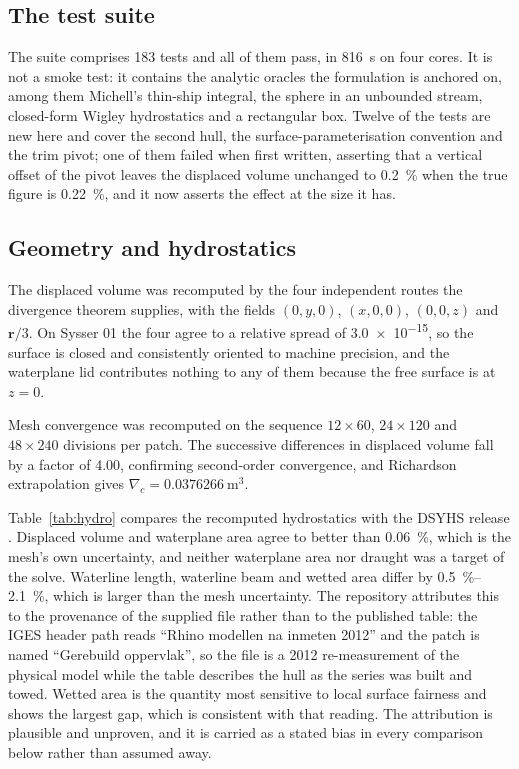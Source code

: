 \documentclass[11pt]{article}
\begin{document}
\subsection{The test suite}

The suite comprises 183 tests and all of them pass, in \SI{816}{\second} on four cores.
It is not a smoke test: it contains the analytic oracles the formulation is anchored on,
among them Michell's thin-ship integral, the sphere in an unbounded stream, closed-form
Wigley hydrostatics and a rectangular box. Twelve of the tests are new here and cover the
second hull, the surface-parameterisation convention and the trim pivot; one of them failed
when first written, asserting that a vertical offset of the pivot leaves the displaced volume
unchanged to \SI{0.2}{\percent} when the true figure is \SI{0.22}{\percent}, and it now
asserts the effect at the size it has.

\subsection{Geometry and hydrostatics}

The displaced volume was recomputed by the four independent routes the divergence theorem
supplies, with the fields $(0,y,0)$, $(x,0,0)$, $(0,0,z)$ and $\bm{r}/3$. On Sysser 01 the
four agree to a relative spread of \num{3.0e-15}, so the surface is closed and consistently
oriented to machine precision, and the waterplane lid contributes nothing to any of them
because the free surface is at $z=0$.

Mesh convergence was recomputed on the sequence $12\times60$, $24\times120$ and
$48\times240$ divisions per patch. The successive differences in displaced volume fall by a
factor of 4.00, confirming second-order convergence, and Richardson extrapolation gives
$\nabla_c = \SI{0.0376266}{\metre\cubed}$.

Table~\ref{tab:hydro} compares the recomputed hydrostatics with the DSYHS release
\citep{dsyhs_hydro}. Displaced volume and waterplane area agree to better than
\SI{0.06}{\percent}, which is the mesh's own uncertainty, and neither waterplane area nor
draught was a target of the solve. Waterline length, waterline beam and wetted area differ
by \SIrange{0.5}{2.1}{\percent}, which is larger than the mesh uncertainty. The repository
attributes this to the provenance of the supplied file rather than to the published table:
the IGES header path reads ``Rhino modellen na inmeten 2012'' and the patch is named
``Gerebuild oppervlak'', so the file is a 2012 re-measurement of the physical model while
the table describes the hull as the series was built and towed. Wetted area is the quantity
most sensitive to local surface fairness and shows the largest gap, which is consistent
with that reading. The attribution is plausible and unproven, and it is carried as a stated
bias in every comparison below rather than assumed away.
\end{document}
